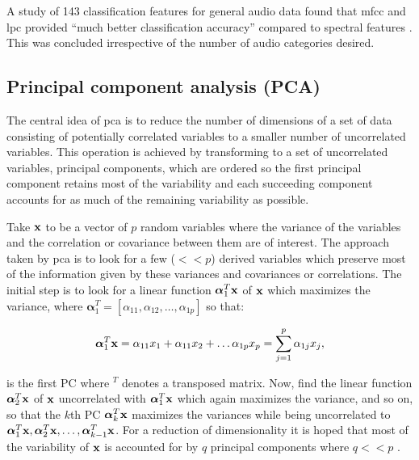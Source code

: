 A study of 143 classification features for general audio data found that \gls{mfcc} and \gls{lpc} provided ``much better classification accuracy'' compared to spectral features \cite{Li2001}. This was concluded irrespective of the number of audio categories desired.

\subsection{Principal component analysis (PCA)}
The central idea of \gls{pca} is to reduce the number of dimensions of a set of data consisting of potentially correlated variables to a smaller number of uncorrelated variables. This operation is achieved by transforming to a set of uncorrelated variables, principal components, which are ordered so the first principal component retains most of the variability and each succeeding component accounts for as much of the remaining variability as possible.

Take $\textrm{\textbf{x}}$ to be a vector of $p$ random variables where the variance of the variables and the correlation or covariance between them are of interest. The approach taken by \gls{pca} is to look for a few ($<<p$) derived variables which preserve most of the information given by these variances and covariances or correlations. The initial step is to look for a linear function $\boldsymbol\alpha_1^T \textrm{\textbf{x}}$ of $\textrm{\textbf{x}}$ which maximizes the variance, where $\boldsymbol\alpha_1^T =  [\alpha_{1{}1},\alpha_{1{}2},\ldots,\alpha_{1{}p}]$ so that:

\begin{equation}\label{eq:PCAdef}
\boldsymbol\alpha_1^T \textrm{\textbf{x}}= \alpha_{1{}1}x_1 +\alpha_{1{}1} x_2 + \ldots \alpha_{1{}p} x_p = \sum^p_{j=1}\alpha_{1{}j}x_j,
\end{equation}

is the first PC where ${}^T$ denotes a transposed matrix.
Now, find the linear function $\boldsymbol\alpha_2^T \textrm{\textbf{x}}$ of $\textrm{\textbf{x}}$ uncorrelated with $\boldsymbol\alpha_1^T \textrm{\textbf{x}}$ which again maximizes the variance, and so on, so that the $k$th PC $\boldsymbol\alpha_k^T \textrm{\textbf{x}}$ maximizes the variances while being uncorrelated to $\boldsymbol\alpha_1^T \textrm{\textbf{x}}, \boldsymbol\alpha_2^T \textrm{\textbf{x}}, \ldots, \boldsymbol\alpha_{k-1}^T \textrm{\textbf{x}}$. For a reduction of dimensionality it is hoped that most of the variability of $\textrm{\textbf{x}}$ is accounted for by $q$ principal components where $q<<p$ \citep[chap. 1]{Jolliffe1986}.

